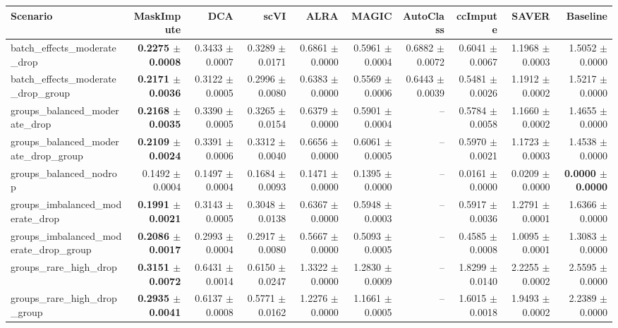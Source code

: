 \begin{tabular}{@{}lrrrrrrrrr@{}}
\toprule
Scenario & MaskImpute & DCA & scVI & ALRA & MAGIC & AutoClass & ccImpute & SAVER & Baseline \\
\midrule
batch\_effects\_moderate\_drop & \textbf{0.2275 $\pm$ 0.0008} & 0.3433 $\pm$ 0.0007 & 0.3289 $\pm$ 0.0171 & 0.6861 $\pm$ 0.0000 & 0.5961 $\pm$ 0.0004 & 0.6882 $\pm$ 0.0072 & 0.6041 $\pm$ 0.0067 & 1.1968 $\pm$ 0.0003 & 1.5052 $\pm$ 0.0000 \\
batch\_effects\_moderate\_drop\_group & \textbf{0.2171 $\pm$ 0.0036} & 0.3122 $\pm$ 0.0005 & 0.2996 $\pm$ 0.0080 & 0.6383 $\pm$ 0.0000 & 0.5569 $\pm$ 0.0006 & 0.6443 $\pm$ 0.0039 & 0.5481 $\pm$ 0.0026 & 1.1912 $\pm$ 0.0002 & 1.5217 $\pm$ 0.0000 \\
groups\_balanced\_moderate\_drop & \textbf{0.2168 $\pm$ 0.0035} & 0.3390 $\pm$ 0.0005 & 0.3265 $\pm$ 0.0154 & 0.6379 $\pm$ 0.0000 & 0.5901 $\pm$ 0.0004 & -- & 0.5784 $\pm$ 0.0058 & 1.1660 $\pm$ 0.0002 & 1.4655 $\pm$ 0.0000 \\
groups\_balanced\_moderate\_drop\_group & \textbf{0.2109 $\pm$ 0.0024} & 0.3391 $\pm$ 0.0006 & 0.3312 $\pm$ 0.0040 & 0.6656 $\pm$ 0.0000 & 0.6061 $\pm$ 0.0005 & -- & 0.5970 $\pm$ 0.0021 & 1.1723 $\pm$ 0.0003 & 1.4538 $\pm$ 0.0000 \\
groups\_balanced\_nodrop & 0.1492 $\pm$ 0.0004 & 0.1497 $\pm$ 0.0004 & 0.1684 $\pm$ 0.0093 & 0.1471 $\pm$ 0.0000 & 0.1395 $\pm$ 0.0000 & -- & 0.0161 $\pm$ 0.0000 & 0.0209 $\pm$ 0.0000 & \textbf{0.0000 $\pm$ 0.0000} \\
groups\_imbalanced\_moderate\_drop & \textbf{0.1991 $\pm$ 0.0021} & 0.3143 $\pm$ 0.0005 & 0.3048 $\pm$ 0.0138 & 0.6367 $\pm$ 0.0000 & 0.5948 $\pm$ 0.0003 & -- & 0.5917 $\pm$ 0.0036 & 1.2791 $\pm$ 0.0001 & 1.6366 $\pm$ 0.0000 \\
groups\_imbalanced\_moderate\_drop\_group & \textbf{0.2086 $\pm$ 0.0017} & 0.2993 $\pm$ 0.0004 & 0.2917 $\pm$ 0.0080 & 0.5667 $\pm$ 0.0000 & 0.5093 $\pm$ 0.0005 & -- & 0.4585 $\pm$ 0.0008 & 1.0095 $\pm$ 0.0001 & 1.3083 $\pm$ 0.0000 \\
groups\_rare\_high\_drop & \textbf{0.3151 $\pm$ 0.0072} & 0.6431 $\pm$ 0.0014 & 0.6150 $\pm$ 0.0247 & 1.3322 $\pm$ 0.0000 & 1.2830 $\pm$ 0.0009 & -- & 1.8299 $\pm$ 0.0140 & 2.2255 $\pm$ 0.0002 & 2.5595 $\pm$ 0.0000 \\
groups\_rare\_high\_drop\_group & \textbf{0.2935 $\pm$ 0.0041} & 0.6137 $\pm$ 0.0008 & 0.5771 $\pm$ 0.0162 & 1.2276 $\pm$ 0.0000 & 1.1661 $\pm$ 0.0005 & -- & 1.6015 $\pm$ 0.0018 & 1.9493 $\pm$ 0.0002 & 2.2389 $\pm$ 0.0000 \\

\end{tabular}
